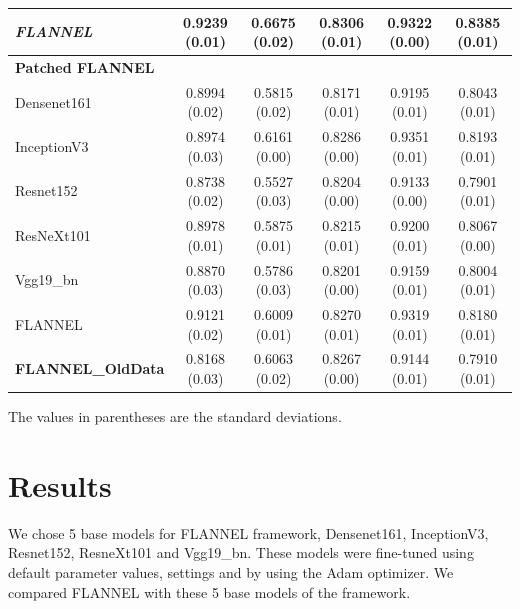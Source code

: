 \documentclass{sigkddExp}
\begin{document}
\begin{table}
\begin{tabular}{ |lccccc| }
        \textit{FLANNEL}                   & 0.9239 (0.01) & 0.6675 (0.02)   & 0.8306 (0.01)      &
        0.9322 (0.00)             & 0.8385 (0.01)                                          \\ \hline
        \textbf{Patched FLANNEL}  &               &                 &                    &
                                  &                                                        \\
        Densenet161               & 0.8994 (0.02) & 0.5815 (0.02)   & 0.8171 (0.01)      &
        0.9195 (0.01)             & 0.8043 (0.01)                                          \\
        InceptionV3               & 0.8974 (0.03) & 0.6161 (0.00)   & 0.8286 (0.00)      &
        0.9351 (0.01)             & 0.8193 (0.01)                                          \\
        Resnet152                 & 0.8738 (0.02) & 0.5527 (0.03)   & 0.8204 (0.00)      &
        0.9133 (0.00)             & 0.7901 (0.01)                                          \\
        ResNeXt101                & 0.8978 (0.01) & 0.5875 (0.01)   & 0.8215 (0.01)      &
        0.9200 (0.01)             & 0.8067 (0.00)                                          \\
        Vgg19\_bn                 & 0.8870 (0.03) & 0.5786 (0.03)   & 0.8201 (0.00)      &
        0.9159 (0.01)             & 0.8004 (0.01)                                          \\

        FLANNEL                   & 0.9121 (0.02) & 0.6009 (0.01)   & 0.8270 (0.01)      &
        0.9319 (0.01)             & 0.8180 (0.01)                                          \\ \hline
        \textbf{FLANNEL\_OldData} & 0.8168 (0.03) & 0.6063 (0.02)   & 0.8267 (0.00)      &
        0.9144 (0.01)             & 0.7910 (0.01)                                          \\ \hline
    \end{tabular}\par
    \bigskip
    The values in parentheses are the standard deviations.
\end{table}

\section{Results}

We chose 5 base models for FLANNEL framework, Densenet161, InceptionV3,
Resnet152, ResneXt101 and Vgg19\_bn. These models were fine-tuned using default
parameter values, settings and by using the Adam optimizer. We compared FLANNEL
with these 5 base models of the framework.
\end{document}

